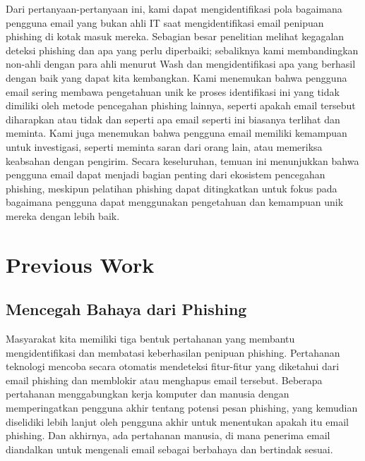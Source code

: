 \documentclass[lettersize,journal]{IEEEtran}
\begin{document}
Dari pertanyaan-pertanyaan ini, kami dapat mengidentifikasi pola bagaimana
pengguna email yang bukan ahli IT saat mengidentifikasi email penipuan
phishing di kotak masuk mereka. Sebagian besar penelitian melihat kegagalan
deteksi phishing dan apa yang perlu diperbaiki; sebaliknya kami membandingkan
non-ahli dengan para ahli menurut Wash dan mengidentifikasi apa yang berhasil dengan
baik yang dapat kita kembangkan. Kami menemukan bahwa pengguna email sering
membawa pengetahuan unik ke proses identifikasi ini yang tidak dimiliki oleh
metode pencegahan phishing lainnya, seperti apakah email tersebut diharapkan
atau tidak dan seperti apa email seperti ini biasanya terlihat dan meminta.
Kami juga menemukan bahwa pengguna email memiliki kemampuan untuk
investigasi, seperti meminta saran dari orang lain, atau memeriksa keabsahan
dengan pengirim. Secara keseluruhan, temuan ini menunjukkan bahwa pengguna
email dapat menjadi bagian penting dari ekosistem pencegahan phishing, meskipun
pelatihan phishing dapat ditingkatkan untuk fokus pada bagaimana pengguna dapat 
menggunakan pengetahuan dan kemampuan unik mereka dengan lebih baik.

\section{Previous Work}

\subsection{Mencegah Bahaya dari Phishing}
Masyarakat kita memiliki tiga bentuk pertahanan yang membantu mengidentifikasi
dan membatasi keberhasilan penipuan phishing. Pertahanan teknologi mencoba
secara otomatis mendeteksi fitur-fitur yang diketahui dari email phishing dan
memblokir atau menghapus email tersebut. Beberapa pertahanan menggabungkan
kerja komputer dan manusia dengan memperingatkan pengguna akhir tentang potensi
pesan phishing, yang kemudian diselidiki lebih lanjut oleh pengguna akhir untuk
menentukan apakah itu email phishing. Dan akhirnya, ada pertahanan manusia, di
mana penerima email diandalkan untuk mengenali email sebagai berbahaya dan
bertindak sesuai.
\end{document}
